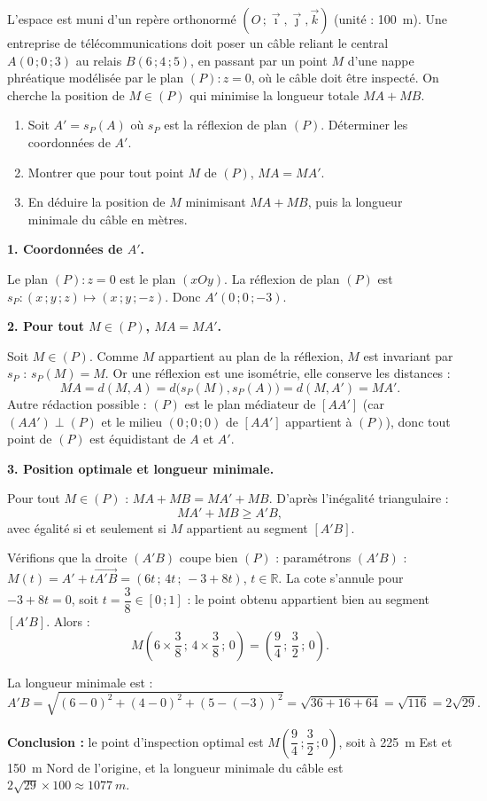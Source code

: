 \documentclass[11pt]{article}
\begin{document}
\begin{exoresolu}
L'espace est muni d'un repère orthonormé $(O\,;\vec{\imath},\vec{\jmath},\vec{k})$ (unité : \SI{100}{m}). Une entreprise de télécommunications doit poser un câble reliant le central $A(0\,;0\,;3)$ au relais $B(6\,;4\,;5)$, en passant par un point $M$ d'une nappe phréatique modélisée par le plan $(P):z=0$, où le câble doit être inspecté. On cherche la position de $M\in(P)$ qui minimise la longueur totale $MA+MB$.
\begin{enumerate}
\item Soit $A'=s_{P}(A)$ où $s_{P}$ est la réflexion de plan $(P)$. Déterminer les coordonnées de $A'$.
\item Montrer que pour tout point $M$ de $(P)$, $MA=MA'$.
\item En déduire la position de $M$ minimisant $MA+MB$, puis la longueur minimale du câble en mètres.
\end{enumerate}
\tcblower
\textbf{1. Coordonnées de $A'$.}

Le plan $(P):z=0$ est le plan $(xOy)$. La réflexion de plan $(P)$ est $s_{P}:(x\,;y\,;z)\mapsto(x\,;y\,;-z)$. Donc $A'(0\,;0\,;-3)$.

\textbf{2. Pour tout $M\in(P)$, $MA=MA'$.}

Soit $M\in(P)$. Comme $M$ appartient au plan de la réflexion, $M$ est invariant par $s_{P}$ : $s_{P}(M)=M$. Or une réflexion est une isométrie, elle conserve les distances :
\[MA=d(M,A)=d\big(s_{P}(M),s_{P}(A)\big)=d(M,A')=MA'.\]
Autre rédaction possible : $(P)$ est le plan médiateur de $[AA']$ (car $(AA')\perp(P)$ et le milieu $(0\,;0\,;0)$ de $[AA']$ appartient à $(P)$), donc tout point de $(P)$ est équidistant de $A$ et $A'$.

\textbf{3. Position optimale et longueur minimale.}

Pour tout $M\in(P)$ : $MA+MB=MA'+MB$. D'après l'inégalité triangulaire :
\[MA'+MB\geq A'B,\]
avec égalité si et seulement si $M$ appartient au segment $[A'B]$.

Vérifions que la droite $(A'B)$ coupe bien $(P)$ : paramétrons $(A'B)$ : $M(t)=A'+t\overrightarrow{A'B}=(6t\,;\,4t\,;\,-3+8t)$, $t\in\mathbb{R}$. La cote s'annule pour $-3+8t=0$, soit $t=\dfrac{3}{8}\in[0\,;1]$ : le point obtenu appartient bien au segment $[A'B]$. Alors :
\[M\left(6\times\frac{3}{8}\,;\,4\times\frac{3}{8}\,;\,0\right)=\left(\frac{9}{4}\,;\,\frac{3}{2}\,;\,0\right).\]

La longueur minimale est :
\[A'B=\sqrt{(6-0)^{2}+(4-0)^{2}+(5-(-3))^{2}}=\sqrt{36+16+64}=\sqrt{116}=2\sqrt{29}.\]

\textbf{Conclusion :} le point d'inspection optimal est $M\left(\dfrac{9}{4}\,;\dfrac{3}{2}\,;0\right)$, soit à \SI{225}{m} Est et \SI{150}{m} Nord de l'origine, et la longueur minimale du câble est $2\sqrt{29}\times 100\approx \SI{1077}{m}$.
\end{exoresolu}
\end{document}
